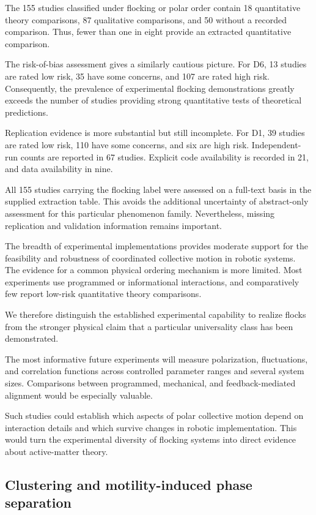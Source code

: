 The 155 studies classified under flocking
or polar order contain 18 quantitative
theory comparisons, 87 qualitative
comparisons, and 50 without a recorded
comparison. Thus, fewer than one in
eight provide an extracted quantitative
comparison.

The risk-of-bias assessment gives a
similarly cautious picture.
For D6, 13 studies are rated low risk,
35 have some concerns, and 107
are rated high risk. Consequently,
the prevalence of experimental
flocking demonstrations greatly
exceeds the number of studies
providing strong quantitative
tests of theoretical predictions.

Replication evidence is more
substantial but still incomplete.
For D1, 39 studies are rated low
risk, 110 have some concerns,
and six are high risk.
Independent-run counts are
reported in 67 studies.
Explicit code availability
is recorded in 21,
and data availability in nine.

All 155 studies carrying the
flocking label were assessed
on a full-text basis in the
supplied extraction table.
This avoids the additional
uncertainty of abstract-only
assessment for this
particular phenomenon family.
Nevertheless, missing
replication and validation
information remains important.

The breadth of experimental
implementations provides
moderate support for the
feasibility and robustness
of coordinated collective
motion in robotic systems.
The evidence for a common
physical ordering mechanism
is more limited. Most
experiments use programmed
or informational interactions,
and comparatively few
report low-risk quantitative
theory comparisons.

We therefore distinguish
the established experimental
capability to realize flocks
from the stronger physical
claim that a particular
universality class has
been demonstrated.

The most informative future
experiments will measure
polarization, fluctuations,
and correlation functions
across controlled parameter
ranges and several system
sizes. Comparisons between
programmed, mechanical,
and feedback-mediated
alignment would be
especially valuable.

Such studies could establish
which aspects of polar
collective motion depend
on interaction details
and which survive changes
in robotic implementation.
This would turn the
experimental diversity
of flocking systems into
direct evidence about
active-matter theory.

\subsection{Clustering and motility-induced phase separation}
\label{sec:phenomena-clustering}

